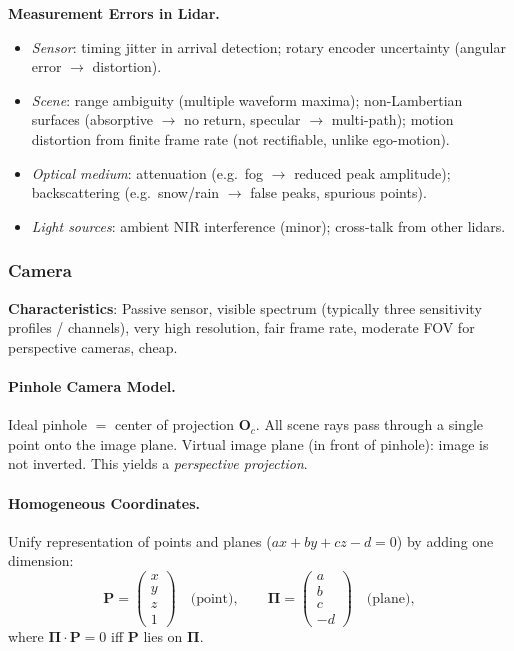 \documentclass{article}
\begin{document}
\textbf{Measurement Errors in Lidar.}
\begin{itemize}
    \item \textit{Sensor}: timing jitter in arrival detection; rotary encoder uncertainty (angular error $\to$ distortion).
    \item \textit{Scene}: range ambiguity (multiple waveform maxima); non-Lambertian surfaces (absorptive $\to$ no return, specular $\to$ multi-path); motion distortion from finite frame rate (not rectifiable, unlike ego-motion).
    \item \textit{Optical medium}: attenuation (e.g.\ fog $\to$ reduced peak amplitude); backscattering (e.g.\ snow/rain $\to$ false peaks, spurious points).
    \item \textit{Light sources}: ambient NIR interference (minor); cross-talk from other lidars.
\end{itemize}

\subsubsection{Camera}
\textbf{Characteristics}: Passive sensor, visible spectrum (typically three sensitivity profiles / channels), very high resolution, fair frame rate, moderate FOV for perspective cameras, cheap.

\paragraph{Pinhole Camera Model.}
Ideal pinhole $=$ center of projection $\mathbf{O}_c$. All scene rays pass through a single point onto the image plane. Virtual image plane (in front of pinhole): image is not inverted. This yields a \textit{perspective projection}.

\paragraph{Homogeneous Coordinates.}
Unify representation of points and planes ($ax+by+cz-d=0$) by adding one dimension:
\begin{equation*}
    \mathbf{P} = \begin{pmatrix} x \\ y \\ z \\ 1 \end{pmatrix} \quad \text{(point)}, \qquad
    \boldsymbol{\Pi} = \begin{pmatrix} a \\ b \\ c \\ -d \end{pmatrix} \quad \text{(plane)},
\end{equation*}
where $\boldsymbol{\Pi} \cdot \mathbf{P} = 0$ iff $\mathbf{P}$ lies on $\boldsymbol{\Pi}$.
\end{document}
